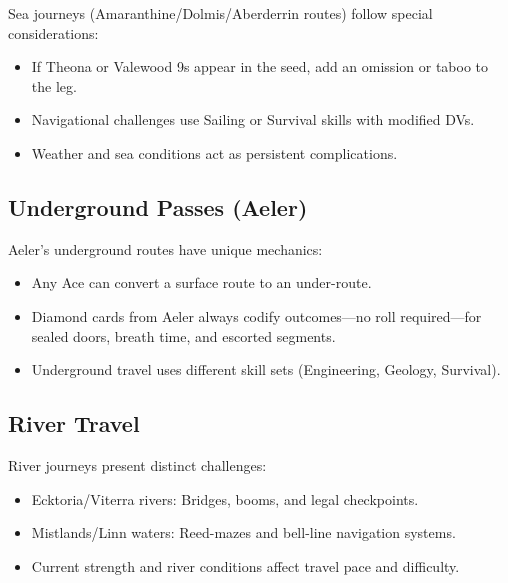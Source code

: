 Sea journeys (Amaranthine/Dolmis/Aberderrin routes) follow special considerations:
\begin{itemize}
\item If Theona or Valewood 9s appear in the seed, add an omission or taboo to the leg.
\item Navigational challenges use Sailing or Survival skills with modified DVs.
\item Weather and sea conditions act as persistent complications.
\end{itemize}

\subsection{Underground Passes (Aeler)}
\label{subsec:underways}

Aeler's underground routes have unique mechanics:
\begin{itemize}
\item Any Ace can convert a surface route to an under-route.
\item Diamond cards from Aeler always codify outcomes—no roll required—for sealed doors, breath time, and escorted segments.
\item Underground travel uses different skill sets (Engineering, Geology, Survival).
\end{itemize}

\subsection{River Travel}
\label{subsec:river-travel}

River journeys present distinct challenges:
\begin{itemize}
\item Ecktoria/Viterra rivers: Bridges, booms, and legal checkpoints.
\item Mistlands/Linn waters: Reed-mazes and bell-line navigation systems.
\item Current strength and river conditions affect travel pace and difficulty.
\end{itemize}

